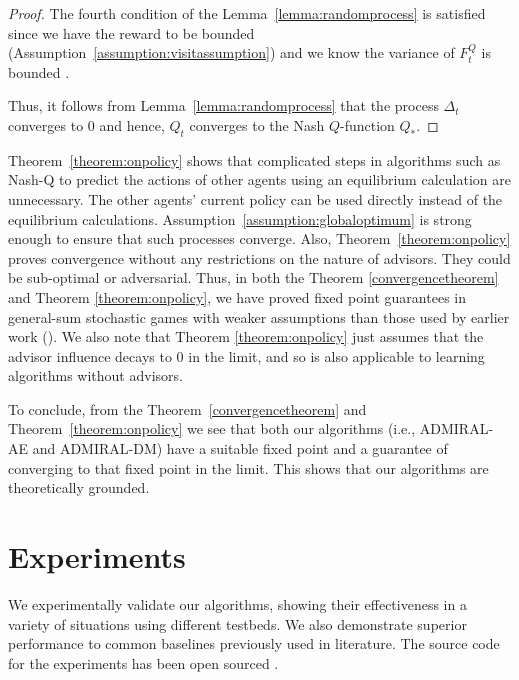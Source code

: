 \documentclass[jair, twoside,11pt,theapa]{article}
\begin{document}
\begin{proof}
The fourth condition of the Lemma~\ref{lemma:randomprocess} is satisfied since we have the reward to be bounded (Assumption~\ref{assumption:visitassumption}) and we know the variance of $F_t^Q$ is bounded \citep{jaakkola1994convergence}. 

Thus, it follows from Lemma~\ref{lemma:randomprocess} that the process $\Delta_t$ converges to 0 and hence, $Q_t$ converges to the Nash $Q$-function $Q_*$. 
\end{proof}





Theorem~\ref{theorem:onpolicy} shows that complicated steps in algorithms such as Nash-Q \citep{hu2003nash} to predict the actions of other agents using an equilibrium calculation are unnecessary. The other agents' current policy can be used directly instead of the equilibrium calculations. Assumption~\ref{assumption:globaloptimum} is strong enough to ensure that such processes converge. 
Also, Theorem~\ref{theorem:onpolicy} proves convergence without any restrictions on the nature of advisors. They could be sub-optimal or adversarial.
Thus, in both the Theorem \ref{convergencetheorem} and Theorem \ref{theorem:onpolicy}, we have proved fixed point guarantees in general-sum stochastic games with  weaker assumptions than those used by earlier work (\citet{hu2003nash}).
We also note that Theorem \ref{theorem:onpolicy} just assumes that the advisor influence decays to 0 in the limit, and so is also applicable to learning algorithms without advisors. 

To conclude, from the Theorem~\ref{convergencetheorem} and Theorem~\ref{theorem:onpolicy} we see that both our algorithms (i.e., ADMIRAL-AE and ADMIRAL-DM) have a suitable fixed point and a guarantee of converging to that fixed point in the limit. This shows that our algorithms are theoretically grounded. 








\section{Experiments}\label{sec:mainexperiments}

We experimentally validate our algorithms, showing their effectiveness in a variety of situations using different testbeds. We also demonstrate superior performance to common baselines previously used in literature. The source code for the experiments has been open sourced \citep{sourcecode}.
\end{document}
